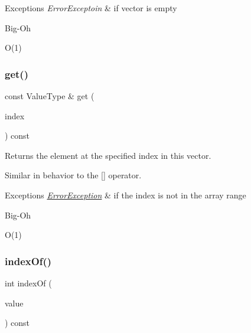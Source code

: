 \begin{DoxyExceptions}{Exceptions}
{\em Error\+Exceptoin} & if vector is empty \\
\hline
\end{DoxyExceptions}
\begin{DoxyRefDesc}{Big-\/\+Oh}
\item[\mbox{\hyperlink{BigOh__BigOh000112}{Big-\/\+Oh}}]O(1) \end{DoxyRefDesc}
\mbox{\label{classVector_adcb38df411d14f0bd9c14e23947d2e1c}} 
\subsubsection{\texorpdfstring{get()}{get()}}
{\footnotesize\ttfamily const Value\+Type \& get (\begin{DoxyParamCaption}\item[{int}]{index }\end{DoxyParamCaption}) const}



Returns the element at the specified index in this vector. 

Similar in behavior to the \mbox{[}\mbox{]} operator. 
\begin{DoxyExceptions}{Exceptions}
{\em \mbox{\hyperlink{classErrorException}{Error\+Exception}}} & if the index is not in the array range \\
\hline
\end{DoxyExceptions}
\begin{DoxyRefDesc}{Big-\/\+Oh}
\item[\mbox{\hyperlink{BigOh__BigOh000113}{Big-\/\+Oh}}]O(1) \end{DoxyRefDesc}
\mbox{\label{classVector_a619aacfb96804495d3182a7131cf3539}} 
\subsubsection{\texorpdfstring{index\+Of()}{indexOf()}}
{\footnotesize\ttfamily int index\+Of (\begin{DoxyParamCaption}\item[{const Value\+Type \&}]{value }\end{DoxyParamCaption}) const}



